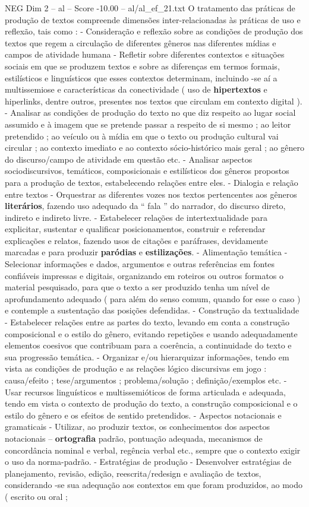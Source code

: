 \begin{textsample}{NEG Dim 2 – al – Score -10.00 – al/al\_ef\_21.txt}
O tratamento das práticas de produção de textos compreende dimensões inter-relacionadas às práticas de uso e reflexão, tais como : - Consideração e reflexão sobre as condições de produção dos textos que regem a circulação de diferentes gêneros nas diferentes mídias e campos de atividade humana - Refletir sobre diferentes contextos e situações sociais em que se produzem textos e sobre as diferenças em termos formais, estilísticos e linguísticos que esses contextos determinam, incluindo -se aí a multissemiose e características da conectividade ( uso de \textbf{hipertextos} e hiperlinks, dentre outros, presentes nos textos que circulam em contexto digital ). - Analisar as condições de produção do texto no que diz respeito ao lugar social assumido e à imagem que se pretende passar a respeito de si mesmo ; ao leitor pretendido ; ao veículo ou à mídia em que o texto ou produção cultural vai circular ; ao contexto imediato e ao contexto sócio-histórico mais geral ; ao gênero do discurso/campo de atividade em questão etc. - Analisar aspectos sociodiscursivos, temáticos, composicionais e estilísticos dos gêneros propostos para a produção de textos, estabelecendo relações entre eles. - Dialogia e relação entre textos - Orquestrar as diferentes vozes nos textos pertencentes aos gêneros \textbf{literários}, fazendo uso adequado da “ fala ” do narrador, do discurso direto, indireto e indireto livre. - Estabelecer relações de intertextualidade para explicitar, sustentar e qualificar posicionamentos, construir e referendar explicações e relatos, fazendo usos de citações e paráfrases, devidamente marcadas e para produzir \textbf{paródias} e \textbf{estilizações}. - Alimentação temática - Selecionar informações e dados, argumentos e outras referências em fontes confiáveis impressas e digitais, organizando em roteiros ou outros formatos o material pesquisado, para que o texto a ser produzido tenha um nível de aprofundamento adequado ( para além do senso comum, quando for esse o caso ) e contemple a sustentação das posições defendidas. - Construção da textualidade - Estabelecer relações entre as partes do texto, levando em conta a construção composicional e o estilo do gênero, evitando repetições e usando adequadamente elementos coesivos que contribuam para a coerência, a continuidade do texto e sua progressão temática. - Organizar e/ou hierarquizar informações, tendo em vista as condições de produção e as relações lógico discursivas em jogo : causa/efeito ; tese/argumentos ; problema/solução ; definição/exemplos etc. - Usar recursos linguísticos e multissemióticos de forma articulada e adequada, tendo em vista o contexto de produção do texto, a construção composicional e o estilo do gênero e os efeitos de sentido pretendidos. - Aspectos notacionais e gramaticais - Utilizar, ao produzir textos, os conhecimentos dos aspectos notacionais – \textbf{ortografia} padrão, pontuação adequada, mecanismos de concordância nominal e verbal, regência verbal etc., sempre que o contexto exigir o uso da norma-padrão. - Estratégias de produção - Desenvolver estratégias de planejamento, revisão, edição, reescrita/redesign e avaliação de textos, considerando -se sua adequação aos contextos em que foram produzidos, ao modo ( escrito ou oral ; 
\end{textsample}
